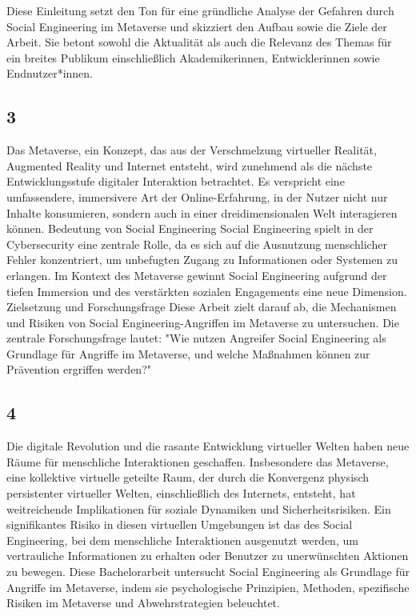 Diese Einleitung setzt den Ton für eine gründliche Analyse der Gefahren durch Social Engineering im Metaverse und skizziert den Aufbau sowie die Ziele der Arbeit. Sie betont sowohl die Aktualität als auch die Relevanz des Themas für ein breites Publikum einschließlich Akademikerinnen, Entwicklerinnen sowie Endnutzer*innen.

\subsection*{3}
Das Metaverse, ein Konzept, das aus der Verschmelzung virtueller Realität, Augmented Reality und Internet entsteht, wird zunehmend als die nächste Entwicklungsstufe digitaler Interaktion betrachtet. Es verspricht eine umfassendere, immersivere Art der Online-Erfahrung, in der Nutzer nicht nur Inhalte konsumieren, sondern auch in einer dreidimensionalen Welt interagieren können.
Bedeutung von Social Engineering
Social Engineering spielt in der Cybersecurity eine zentrale Rolle, da es sich auf die Ausnutzung menschlicher Fehler konzentriert, um unbefugten Zugang zu Informationen oder Systemen zu erlangen. Im Kontext des Metaverse gewinnt Social Engineering aufgrund der tiefen Immersion und des verstärkten sozialen Engagements eine neue Dimension.
Zielsetzung und Forschungsfrage
Diese Arbeit zielt darauf ab, die Mechanismen und Risiken von Social Engineering-Angriffen im Metaverse zu untersuchen. Die zentrale Forschungsfrage lautet: "Wie nutzen Angreifer Social Engineering als Grundlage für Angriffe im Metaverse, und welche Maßnahmen können zur Prävention ergriffen werden?"

\subsection*{4}
Die digitale Revolution und die rasante Entwicklung virtueller Welten haben neue Räume für menschliche Interaktionen geschaffen. Insbesondere das Metaverse, eine kollektive virtuelle geteilte Raum, der durch die Konvergenz physisch persistenter virtueller Welten, einschließlich des Internets, entsteht, hat weitreichende Implikationen für soziale Dynamiken und Sicherheitsrisiken. Ein signifikantes Risiko in diesen virtuellen Umgebungen ist das des Social Engineering, bei dem menschliche Interaktionen ausgenutzt werden, um vertrauliche Informationen zu erhalten oder Benutzer zu unerwünschten Aktionen zu bewegen. Diese Bachelorarbeit untersucht Social Engineering als Grundlage für Angriffe im Metaverse, indem sie psychologische Prinzipien, Methoden, spezifische Risiken im Metaverse und Abwehrstrategien beleuchtet.


